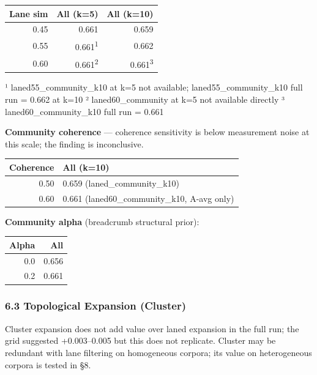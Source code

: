 \begin{small}
\setlength{\tabcolsep}{4pt}
\begin{longtable}{rrr}
\toprule
\textbf{Lane sim} & \textbf{All (k=5)} & \textbf{All (k=10)} \\
\midrule
\endhead
0.45 & 0.661 & 0.659 \\
0.55 & 0.661\textsuperscript{1} & 0.662 \\
0.60 & 0.661\textsuperscript{2} & 0.661\textsuperscript{3} \\
\bottomrule
\end{longtable}
\end{small}

¹ laned55\_community\_k10 at k=5 not available; laned55\_community\_k10 full run = 0.662 at k=10 ² laned60\_community at k=5 not available directly ³ laned60\_community\_k10 full run = 0.661

\textbf{Community coherence} --- coherence sensitivity is below measurement noise at this scale; the finding is inconclusive.

\begin{small}
\setlength{\tabcolsep}{4pt}
\begin{longtable}{rp{3.5in}}
\toprule
\textbf{Coherence} & \textbf{All (k=10)} \\
\midrule
\endhead
0.50 & 0.659 (laned\_community\_k10) \\
0.60 & 0.661 (laned60\_community\_k10, A-avg only) \\
\bottomrule
\end{longtable}
\end{small}

\textbf{Community alpha} (breadcrumb structural prior):

\begin{small}
\setlength{\tabcolsep}{4pt}
\begin{longtable}{rr}
\toprule
\textbf{Alpha} & \textbf{All} \\
\midrule
\endhead
0.0 & 0.656 \\
0.2 & 0.661 \\
\bottomrule
\end{longtable}
\end{small}

\subsubsection{6.3 Topological Expansion (Cluster)}\label{topological-expansion-cluster}

Cluster expansion does not add value over laned expansion in the full run; the grid suggested +0.003--0.005 but this does not replicate. Cluster may be redundant with lane filtering on homogeneous corpora; its value on heterogeneous corpora is tested in §8.

